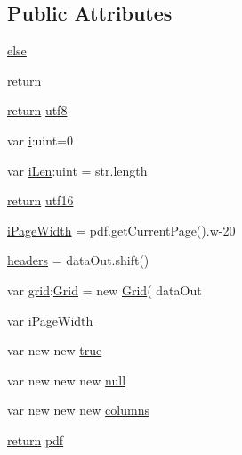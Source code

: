 \subsection*{Public Attributes}
\begin{DoxyCompactItemize}
\item 
\hyperlink{class_zero_clipboard_a18ece373746e9446cf10bdcf1758648c}{else}
\item 
\hyperlink{class_zero_clipboard_a35a5b97b41eebd1117dbdcefc04a990d}{return}
\item 
\hyperlink{class_zero_clipboard_a35a5b97b41eebd1117dbdcefc04a990d}{return} \hyperlink{class_zero_clipboard_aac6800a9ea2987f07e6cd7d3fb33dcc4}{utf8}
\item 
var \hyperlink{class_zero_clipboard_a6223f7d5fbe005d68fc2491950a20f87}{i}\+:uint=0
\item 
var \hyperlink{class_zero_clipboard_a249befb1af7eb431a5ce5b63344df54d}{i\+Len}\+:uint = str.\+length
\item 
\hyperlink{class_zero_clipboard_a35a5b97b41eebd1117dbdcefc04a990d}{return} \hyperlink{class_zero_clipboard_adea87e5ad97728dbe4c6e07d72bca56b}{utf16}
\item 
\hyperlink{class_zero_clipboard_a14bb672128ccb19450473f6fbf097e5a}{i\+Page\+Width} = pdf.\+get\+Current\+Page().w-\/20
\item 
\hyperlink{class_zero_clipboard_a9ba182b97e1ab9180481caf9f24a63ac}{headers} = data\+Out.\+shift()
\item 
var \hyperlink{class_zero_clipboard_a8a5fe1f6b72c77c227e3fae9547afcb2}{grid}\+:\hyperlink{_zero_clipboard_pdf_8as_ace5cd40904967d6585c3cf19616bb59e}{Grid} = new \hyperlink{_zero_clipboard_pdf_8as_ace5cd40904967d6585c3cf19616bb59e}{Grid}( data\+Out
\item 
var \hyperlink{class_zero_clipboard_ad1b22090b64a946187b46fd832054e07}{i\+Page\+Width}
\item 
var new new \hyperlink{class_zero_clipboard_ab4147b8aacc838ecabcc37b0afa8a676}{true}
\item 
var new new new \hyperlink{class_zero_clipboard_a07e1a60f83830226b8aac053dcef7b9c}{null}
\item 
var new new new \hyperlink{class_zero_clipboard_a350d8f226c904b59086f82f7106ab09a}{columns}
\item 
\hyperlink{class_zero_clipboard_a35a5b97b41eebd1117dbdcefc04a990d}{return} \hyperlink{class_zero_clipboard_a8c06dba36f3a02bf368444f1fa0054af}{pdf}
\end{DoxyCompactItemize}


